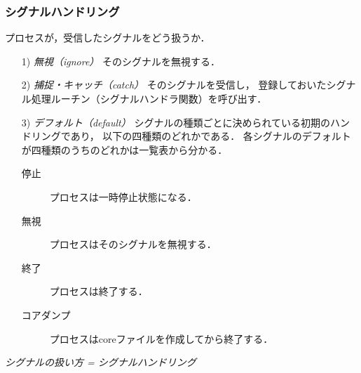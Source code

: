 \documentclass{beamer}                 %
\begin{document}
\begin{frame}[fragile]
  \frametitle{シグナルハンドリング}
  プロセスが，受信したシグナルをどう扱うか．

  \begin{enumerate}
  \item[1)] \emph{無視（ignore）}
    そのシグナルを無視する．
  \item[2)] \emph{捕捉・キャッチ（catch）}
    そのシグナルを受信し，
    登録しておいたシグナル処理ルーチン（シグナルハンドラ関数）を呼び出す．
  \item[3)] \emph{デフォルト（default）}
    シグナルの種類ごとに決められている初期のハンドリングであり，
    以下の四種類のどれかである．
    各シグナルのデフォルトが四種類のうちのどれかは一覧表から分かる．
    \begin{description}
    \item[停止] プロセスは一時停止状態になる．
    \item[無視] プロセスはそのシグナルを無視する．
    \item[終了] プロセスは終了する．
    \item[コアダンプ] プロセスはcoreファイルを作成してから終了する．
  \end{description}
  \end{enumerate}

  \begin{center}
  \emph{\Large{シグナルの扱い方 = シグナルハンドリング}}
  \end{center}

\end{frame}
\end{document}
